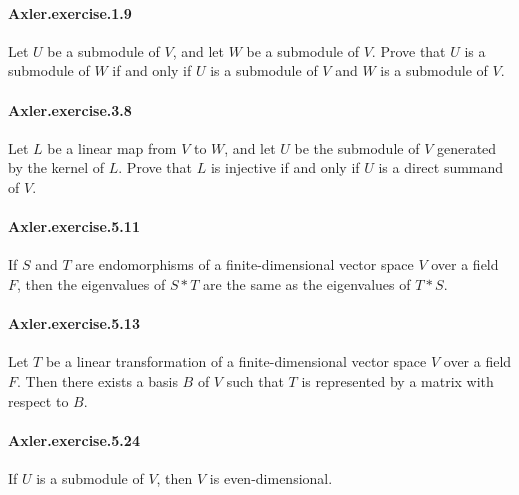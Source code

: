 \documentclass{article}
\begin{document}

\paragraph{Axler.exercise.1.9} Let $U$ be a submodule of $V$, and let $W$ be a submodule of $V$. Prove that $U$ is a submodule of $W$ if and only if $U$ is a submodule of $V$ and $W$ is a submodule of $V$.

\paragraph{Axler.exercise.3.8} Let $L$ be a linear map from $V$ to $W$, and let $U$ be the submodule of $V$ generated by the kernel of $L$. Prove that $L$ is injective if and only if $U$ is a direct summand of $V$.


\paragraph{Axler.exercise.5.11} If $S$ and $T$ are endomorphisms of a finite-dimensional vector space $V$ over a field $F$, then the eigenvalues of $S * T$ are the same as the eigenvalues of $T * S$.

\paragraph{Axler.exercise.5.13} Let $T$ be a linear transformation of a finite-dimensional vector space $V$ over a field $F$. Then there exists a basis $B$ of $V$ such that $T$ is represented by a matrix with respect to $B$.

\paragraph{Axler.exercise.5.24} If $U$ is a submodule of $V$, then $V$ is even-dimensional.
\end{document}

